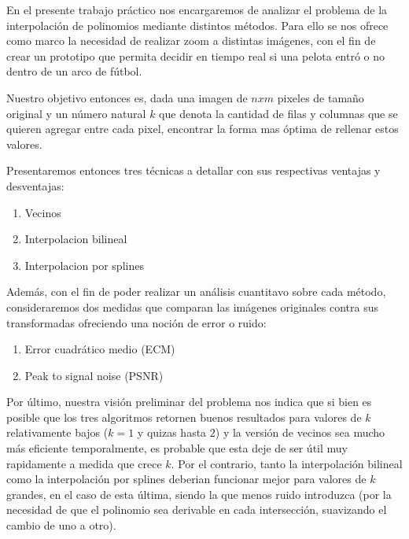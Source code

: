 En el presente trabajo práctico nos encargaremos de analizar el problema de la interpolación de polinomios mediante distintos métodos.
Para ello se nos ofrece como marco la necesidad de realizar zoom a distintas imágenes, con el fin de crear un prototipo que permita decidir en tiempo
real si una pelota entró o no dentro de un arco de fútbol.

Nuestro objetivo entonces es, dada una imagen de $n x m$ pixeles de tamaño original y un número natural $k$ que denota la cantidad de filas y
columnas que se quieren agregar entre cada pixel, encontrar la forma mas óptima de rellenar estos valores.

Presentaremos entonces tres técnicas a detallar con sus respectivas ventajas y desventajas:
\begin{enumerate}
 \item Vecinos
 \item Interpolacion bilineal
 \item Interpolacion por splines
\end{enumerate}

Además, con el fin de poder realizar un análisis cuantitavo sobre cada método, consideraremos dos medidas que comparan las imágenes
originales contra sus transformadas ofreciendo una noción de error o ruido:
\begin{enumerate}
 \item Error cuadrático medio (ECM)
 \item Peak to signal noise (PSNR)
\end{enumerate}

Por último, nuestra visión preliminar del problema nos indica que si bien es posible que los tres algoritmos retornen buenos resultados
para valores de $k$ relativamente bajos ($k = 1$ y quizas hasta $2$) y la versión de vecinos sea mucho más eficiente temporalmente,
es probable que esta deje de ser útil muy rapidamente a medida que crece $k$. Por el contrario, tanto la interpolación bilineal como la
interpolación por splines deberian funcionar mejor para valores de $k$ grandes, en el caso de esta \'ultima, siendo la que menos ruido introduzca
(por la necesidad de que el polinomio sea derivable en cada intersección, suavizando el cambio de uno a otro).
